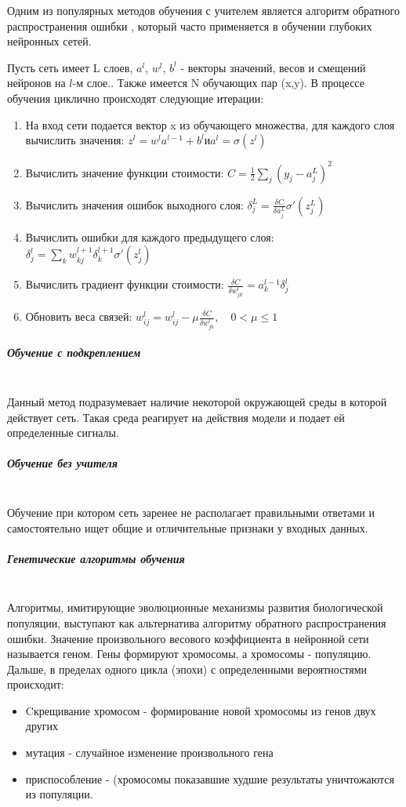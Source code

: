 Одним из популярных методов обучения с учителем является алгоритм обратного распространения ошибки \cite{Nielsen2015}, который часто применяется в обучении глубоких нейронных сетей. 

Пусть сеть имеет L слоев, $a^l$, $w_{}^l$, $b^l$ - векторы значений, весов и смещений нейронов на $l$-м слое.. Также имеется N обучающих пар (x,y). 
В процессе обучения циклично происходят следующие итерации: 

\begin{enumerate}
    \item На вход сети подается вектор x из обучающего множества, для каждого слоя вычислить значения: \hfill $z^l = w^la^{l-1}+b^l и a^l = \sigma(z^l)$
    \item Вычислить значение функции стоимости: \hfill $C = \frac{1}{2}\sum_j{(y_j-a_j^L)^2}$
    \item Вычислить значения ошибок выходного слоя: \hfill $\delta_j^L=\frac{\delta C}{\delta a_j^L}\sigma'(z_j^L)$
    \item Вычислить ошибки для каждого предыдущего слоя: \hfill $\delta_j^l=\sum_k{w_{kj}^{l+1} \delta_k^{l+1}\sigma'(z_j^l)}$
    \item Вычислить градиент функции стоимости: \hfill $\frac{\delta C}{\delta w_{jk}^l} = a_k^{l-1} \delta_j^l$ %
    \item Обновить веса связей: \hfill $w_{ij}^l=w_{ij}^l-\mu\frac{\delta C}{\delta w_{jk}^l},\hspace{1em} 0<\mu \leqslant 1$
\end{enumerate}

\subparagraph{Обучение с подкреплением}\mbox{} \\
 Данный метод подразумевает наличие некоторой окружающей среды в которой действует сеть. Такая среда реагирует на действия модели и подает ей определенные сигналы.  

\subparagraph{Обучение без учителя}\mbox{} \\
Обучение при котором сеть заренее не располагает правильными ответами и самостоятельно ищет общие и отличительные признаки у входных данных. 


\subparagraph{Генетические алгоритмы обучения}\mbox{} \\
 Алгоритмы, имитирующие эволюционные механизмы развития биологической популяции, выступают как альтернатива алгоритму обратного распространения ошибки. Значение произвольного весового коэффициента в нейронной сети называется геном. Гены формируют хромосомы, а хромосомы - популяцию. Дальше, в пределах одного цикла (эпохи) с определенными вероятностями происходит: 
 \begin{itemize}
     \item Cкрещивание хромосом - формирование новой хромосомы из генов двух других
     \item мутация - случайное изменение произвольного гена
     \item приспособление - (хромосомы показавшие худшие результаты уничтожаются из популяции.
 \end{itemize}

